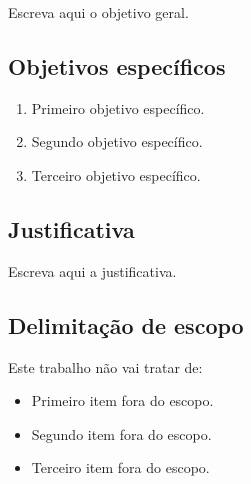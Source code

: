 \documentclass[12pt,a4paper]{article}
\begin{document}
Escreva aqui o objetivo geral.

\subsection{Objetivos específicos}
%
%

\begin{enumerate}
  \item Primeiro objetivo específico.
  \item Segundo objetivo específico.
  \item Terceiro objetivo específico.
\end{enumerate}

\subsection{Justificativa}
%
%

Escreva aqui a justificativa.

\subsection{Delimitação de escopo}

Este trabalho não vai tratar de:

\begin{itemize}
  \item Primeiro item fora do escopo.
  \item Segundo item fora do escopo.
  \item Terceiro item fora do escopo.
\end{itemize}

\end{document}
